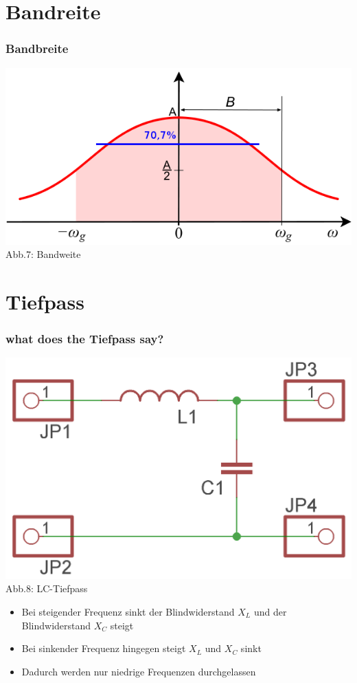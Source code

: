\section*{Bandreite}
\begin{frame}
\frametitle{Bandbreite}
\begin{center}
	\includegraphics[scale=0.4]{e07/Bandbreite.png}\\
	\tiny{Abb.7: Bandweite \cite{wmen}}
\end{center}
\end{frame}

\section*{Tiefpass}
\begin{frame}
\frametitle{what does the Tiefpass say?}
\begin{center}
	\includegraphics[scale=1.2]{e07/LC-Tiefpass.png}\\
	Abb.8: LC-Tiefpass
\end{center}
\begin{itemize}
	\item Bei steigender Frequenz sinkt der Blindwiderstand $X_L$ und der Blindwiderstand $X_C$ steigt
	\item Bei sinkender Frequenz hingegen steigt $X_L$ und $X_C$ sinkt
	\item Dadurch werden nur niedrige Frequenzen durchgelassen 
\end{itemize}
\end{frame}


